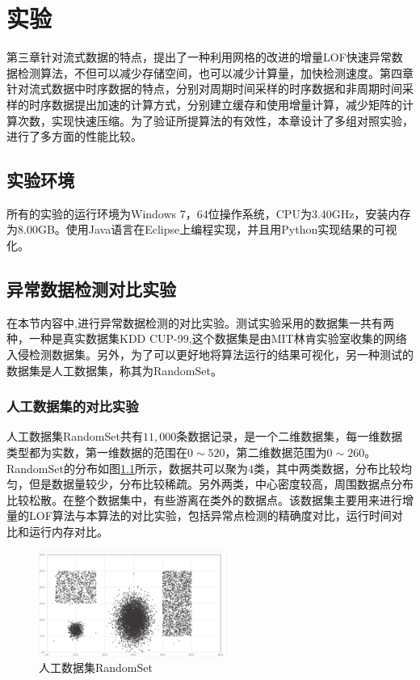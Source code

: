 \chapter{实验}
第三章针对流式数据的特点，提出了一种利用网格的改进的增量LOF快速异常数据检测算法，不但可以减少存储空间，也可以减少计算量，加快检测速度。第四章针对流式数据中时序数据的特点，分别对周期时间采样的时序数据和非周期时间采样的时序数据提出加速的计算方式，分别建立缓存和使用增量计算，减少矩阵的计算次数，实现快速压缩。为了验证所提算法的有效性，本章设计了多组对照实验，进行了多方面的性能比较。

\section{实验环境}
所有的实验的运行环境为Windows 7，64位操作系统，CPU为3.40GHz，安装内存为8.00GB。使用Java语言在Eclipse上编程实现，并且用Python实现结果的可视化。

\section{异常数据检测对比实验}
在本节内容中,进行异常数据检测的对比实验。测试实验采用的数据集一共有两种，一种是真实数据集KDD CUP-99,这个数据集是由MIT林肯实验室收集的网络入侵检测数据集。另外，为了可以更好地将算法运行的结果可视化，另一种测试的数据集是人工数据集，称其为RandomSet。

\subsection{人工数据集的对比实验}
人工数据集RandomSet共有$11,000$条数据记录，是一个二维数据集，每一维数据类型都为实数，第一维数据的范围在$0\sim 520$，第二维数据范围为$0\sim 260$。RandomSet的分布如图\ref{fig:fig51}所示，数据共可以聚为4类，其中两类数据，分布比较均匀，但是数据量较少，分布比较稀疏。另外两类，中心密度较高，周围数据点分布比较松散。在整个数据集中，有些游离在类外的数据点。该数据集主要用来进行增量的LOF算法与本算法的对比实验，包括异常点检测的精确度对比，运行时间对比和运行内存对比。

\begin{figure}[htb]
	\centering
	\includegraphics[width=0.55\textwidth]{figures/figure5x1}
	\caption{人工数据集RandomSet}\label{fig:fig51}
\end{figure}


